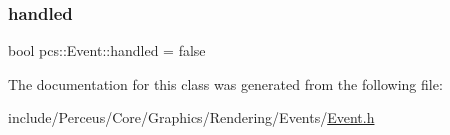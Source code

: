 \subsubsection{\texorpdfstring{handled}{handled}}
{\footnotesize\ttfamily bool pcs\+::\+Event\+::handled = false\hspace{0.3cm}{\ttfamily [protected]}}



The documentation for this class was generated from the following file\+:\begin{DoxyCompactItemize}
\item 
include/\+Perceus/\+Core/\+Graphics/\+Rendering/\+Events/\hyperlink{Event_8h}{Event.\+h}\end{DoxyCompactItemize}
